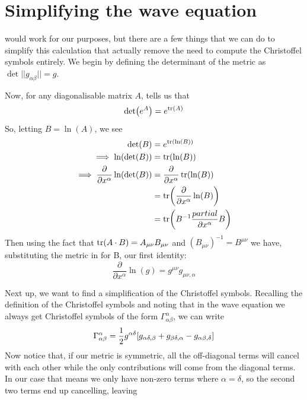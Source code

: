\documentclass[11pt]{article}
\numberwithin{equation}{section}
\numberwithin{figure}{section}
\numberwithin{table}{section}
\begin{document}
\section{Simplifying the wave equation}\label{sec:simplifying wave equation}
\par {} would work for our purposes, but there are a few things that we can do to simplify this calculation that actually remove the need to compute the Christoffel symbols entirely. We begin by defining the determinant of the metric as $\det||g_{\alpha\beta}||=g$. 
\par Now, for any diagonalisable matrix $A$, \cite{determinant thm} tells us that 
\begin{equation}
    \det(e^{A})=e^{\tr(A)}
    \label{eqn:determinant theorem}
\end{equation}
So, letting $B=\ln(A)$, we see
\begin{align*}
    \det(B)&=e^{\tr(\ln(B))}\\
    \implies \ln(\det(B))&=\tr(\ln(B))\\
    \implies \frac{\partial}{\partial x^\alpha}\ln(\det(B))&=\frac{\partial}{\partial x^\alpha}\tr(\ln(B))\\
    &=\tr(\frac{\partial}{\partial x^\alpha}\ln(B))\\
    &=\tr(B^{-1}\frac{partial}{\partial x^\alpha}B)
\end{align*}
Then using the fact that $\tr(A\cdot B)=A_{\mu\nu}B_{\mu\nu}$ and $(B_{\mu\nu})^{-1}=B^{\mu\nu}$ we have, substituting the metric in for B, our first identity:
\begin{equation}
    \frac{\partial}{\partial x^\alpha}\ln(g)=g^{\mu\nu}g_{\mu\nu,\alpha}
    \label{eqn:identity 1}
\end{equation}
\par Next up, we want to find a simplification of the Christoffel symbols. Recalling the definition of the Christoffel symbols and noting that in the wave equation we always get Christoffel symbols of the form $\Gamma^\alpha_{\alpha\beta}$, we can write
\begin{equation*}
    \Gamma^\alpha_{\alpha\beta}=\frac{1}{2}g^{\alpha\delta}[g_{\alpha\delta,\beta}+g_{\beta\delta,\alpha}-g_{\alpha\beta,\delta}]\\
\end{equation*}
Now notice that, if our metric is symmetric, all the off-diagonal terms will cancel with each other while the only contributions will come from the diagonal terms. In our case that means we only have non-zero terms where $\alpha=\delta$, so the second two terms end up cancelling, leaving
\end{document}
